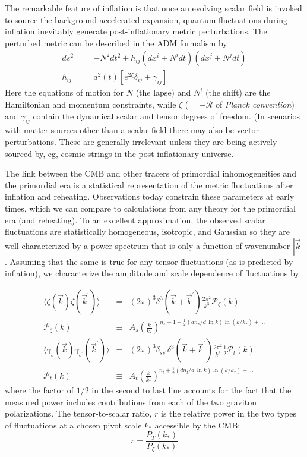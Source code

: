 The remarkable feature of inflation is that once an evolving scalar field is invoked to source the background accelerated expansion, quantum fluctuations during inflation inevitably generate post-inflationary metric perturbations. The perturbed metric can be described in the ADM formalism by
\begin{eqnarray}
\label{eq:metric}
ds^2&=&-N^2dt^2 +h_{ij}(dx^i+N^idt)(dx^j+N^jdt)\nonumber\\
h_{ij}&=&a^2(t)[e^{2\zeta}\delta_{ij}+\gamma_{ij}]
\end{eqnarray}
Here the equations of motion for $N$ (the lapse) and $N^i$ (the shift) are the Hamiltonian and momentum constraints, while $\zeta$ ($=-\mathcal{R}$ of {\it Planck convention}) and $\gamma_{ij}$ contain the dynamical scalar and tensor degrees of freedom. (In scenarios with matter sources other than a scalar field there may also be vector perturbations. These are generally irrelevant unless they are being actively sourced by, eg, cosmic strings in the post-inflationary universe. 

The link between the CMB and other tracers of primordial inhomogeneities and the primordial era is a statistical representation of the metric fluctuations after inflation and reheating. Observations today constrain these parameters at early times, which we can compare to calculations from any theory for the primordial era (and reheating). To an excellent approximation, the observed scalar fluctuations are statistically homogeneous, isotropic, and Gaussian so they are well characterized by a power spectrum that is only a function of wavenumber $|\vec{k}|$. Assuming that the same is true for any tensor fluctuations (as is predicted by inflation), we characterize the amplitude and scale dependence of fluctuations by

\begin{eqnarray}
\langle\zeta(\vec{k})\zeta(\vec{k}^{\prime})\rangle&=&(2\pi)^3\delta^3(\vec{k}+\vec{k}^{\prime})\frac{2\pi^2}{k^3}\mathcal{P}_{\zeta}(k)\nonumber\\
\mathcal{P}_{\zeta}(k)&\equiv& A_s\left(\frac{k}{k_*}\right)^{n_s-1+\frac{1}{2}(dn_s/d\,\ln k)\ln(k/k_*)+\dots}\nonumber\\
\langle\gamma_s(\vec{k})\gamma_{s^{\prime}}(\vec{k}^{\prime})\rangle&=&(2\pi)^3\delta_{ss^{\prime}}\delta^3(\vec{k}+\vec{k}^{\prime})\frac{2\pi^2}{k^3}\frac{1}{2}\mathcal{P}_{t}(k)\nonumber\\
\mathcal{P}_{t}(k)&\equiv& A_t \left(\frac{k}{k_*}\right)^{n_t+\frac{1}{2}(dn_t/d\,\ln k)\ln(k/k_*)+\dots}
\end{eqnarray}
where the factor of $1/2$ in the second to last line accounts for the fact that the measured power includes contributions from each of the two graviton polarizations. 
The tensor-to-scalar ratio, $r$ is the relative power in the two types of fluctuations at a chosen pivot scale $k_*$ accessible by the CMB:
\begin{equation}
r=\frac{P_T(k_*)}{P_{\zeta}(k_*)}
\end{equation}

